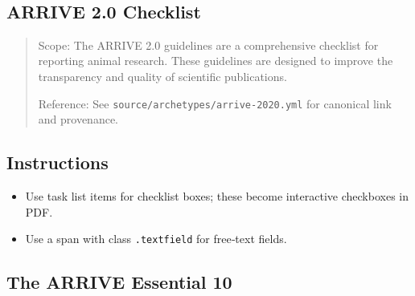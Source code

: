 \documentclass[11pt]{article}
\def\tightlist{}
\begin{document}
\begin{center}
{\LARGE }\\[4pt]
\normalsize 
\end{center}
\vspace{1em}

\begin{Form}

\section{ARRIVE 2.0 Checklist}\label{arrive-2.0-checklist}

\begin{quote}
Scope: The ARRIVE 2.0 guidelines are a comprehensive checklist for
reporting animal research. These guidelines are designed to improve the
transparency and quality of scientific publications.

Reference: See \texttt{source/archetypes/arrive-2020.yml} for canonical
link and provenance.
\end{quote}

\subsection{Instructions}\label{instructions}

\begin{itemize}
\tightlist
\item
  Use task list items for checklist boxes; these become interactive
  checkboxes in PDF.
\item
  Use a span with class \texttt{.textfield} for free‑text fields.
\end{itemize}

\subsection{The ARRIVE Essential 10}\label{the-arrive-essential-10}


\end{Form}
\end{document}
